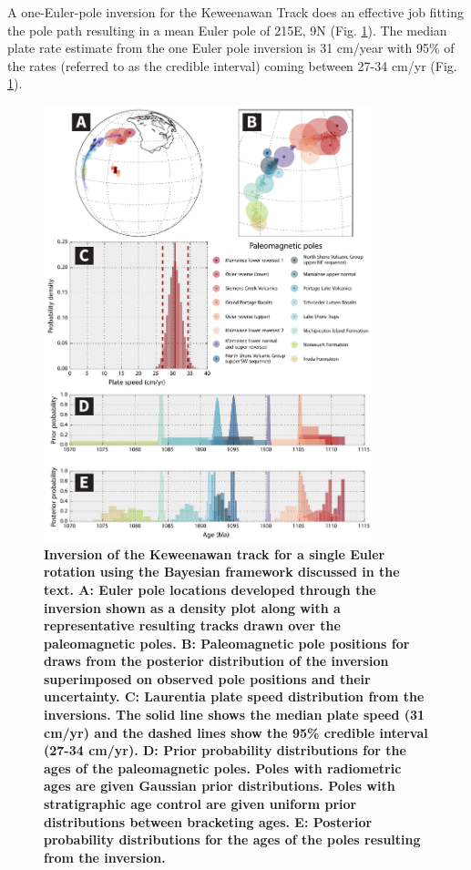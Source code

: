 \documentclass[11pt,letterpaper]{article}
\begin{document}
A one-Euler-pole inversion for the Keweenawan Track does an effective job fitting the pole path resulting in a mean Euler pole of 215\textdegree E, 9\textdegree N (Fig. \ref{fig:bayesian_1_euler}). The median plate rate estimate from the one Euler pole inversion is 31 cm/year with 95$\%$ of the rates (referred to as the credible interval) coming between 27-34 cm/yr (Fig. \ref{fig:bayesian_1_euler}).

\begin{figure}
\begin{centering}
\includegraphics[width=0.85\textwidth]{Figures/Fig10_bayesian_1_euler.pdf}
\caption[Inversion of the Keweenawan track for a single Euler rotation]{\small{\textbf{Inversion of the Keweenawan track for a single Euler rotation using the Bayesian framework discussed in the text. A: Euler pole locations developed through the inversion shown as a density plot along with a representative resulting tracks drawn over the paleomagnetic poles. B: Paleomagnetic pole positions for draws from the posterior distribution of the inversion superimposed on observed pole positions and their uncertainty. C: Laurentia plate speed distribution from the inversions. The solid line shows the median plate speed (31 cm/yr) and the dashed lines show the 95\% credible interval (27-34 cm/yr). D: Prior probability distributions for the ages of the paleomagnetic poles. Poles with radiometric ages are given Gaussian prior distributions. Poles with stratigraphic age control are given uniform prior distributions between bracketing ages. E: Posterior probability distributions for the ages of the poles resulting from the inversion.}}}
\label{fig:bayesian_1_euler}
\end{centering}
\end{figure}
\end{document}
